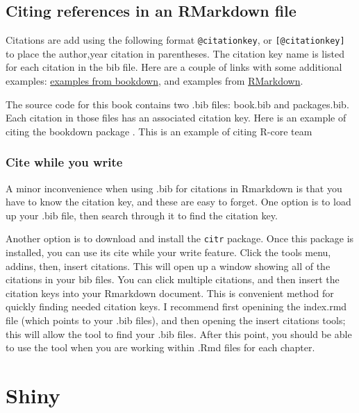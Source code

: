 \documentclass[]{book}
\begin{document}
\section{Citing references in an RMarkdown
file}\label{citing-references-in-an-rmarkdown-file}

Citations are add using the following format \texttt{@citationkey}, or
\texttt{{[}@citationkey{]}} to place the author,year citation in
parentheses. The citation key name is listed for each citation in the
bib file. Here are a couple of links with some additional examples:
\href{https://bookdown.org/yihui/bookdown/citations.html}{examples from
bookdown}, and examples from
\href{http://rmarkdown.rstudio.com/authoring_bibliographies_and_citations.html}{RMarkdown}.

The source code for this book contains two .bib files: book.bib and
packages.bib. Each citation in those files has an associated citation
key. Here is an example of citing the bookdown package \citep{xie2015}.
This is an example of citing R-core team \citep{R-base}

\subsection{Cite while you write}\label{cite-while-you-write}

A minor inconvenience when using .bib for citations in Rmarkdown is that
you have to know the citation key, and these are easy to forget. One
option is to load up your .bib file, then search through it to find the
citation key.

Another option is to download and install the \texttt{citr} package.
Once this package is installed, you can use its cite while your write
feature. Click the tools menu, addins, then, insert citations. This will
open up a window showing all of the citations in your bib files. You can
click multiple citations, and then insert the citation keys into your
Rmarkdown document. This is convenient method for quickly finding needed
citation keys. I recommend first openining the index.rmd file (which
points to your .bib files), and then opening the insert citations tools;
this will allow the tool to find your .bib files. After this point, you
should be able to use the tool when you are working within .Rmd files
for each chapter.

\chapter{Shiny}\label{shiny}
\end{document}

